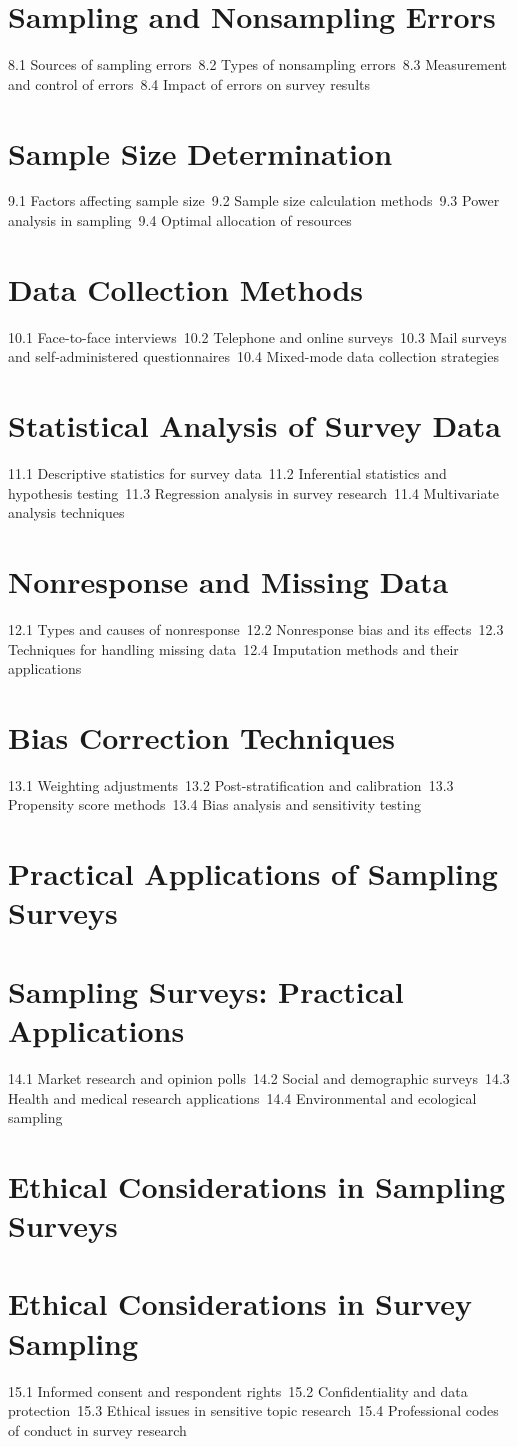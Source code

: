 \section{Sampling and Nonsampling Errors}
8.1 Sources of sampling errors\
8.2 Types of nonsampling errors\
8.3 Measurement and control of errors\
8.4 Impact of errors on survey results\
\section{Sample Size Determination}
9.1 Factors affecting sample size\
9.2 Sample size calculation methods\
9.3 Power analysis in sampling\
9.4 Optimal allocation of resources\
\section{Data Collection Methods}
10.1 Face-to-face interviews\
10.2 Telephone and online surveys\
10.3 Mail surveys and self-administered questionnaires\
10.4 Mixed-mode data collection strategies\
\section{Statistical Analysis of Survey Data}
11.1 Descriptive statistics for survey data\
11.2 Inferential statistics and hypothesis testing\
11.3 Regression analysis in survey research\
11.4 Multivariate analysis techniques\
\section{Nonresponse and Missing Data}
12.1 Types and causes of nonresponse\
12.2 Nonresponse bias and its effects\
12.3 Techniques for handling missing data\
12.4 Imputation methods and their applications\
\section{Bias Correction Techniques}
13.1 Weighting adjustments\
13.2 Post-stratification and calibration\
13.3 Propensity score methods\
13.4 Bias analysis and sensitivity testing\
\section{Practical Applications of Sampling Surveys}
\section{Sampling Surveys: Practical Applications}
14.1 Market research and opinion polls\
14.2 Social and demographic surveys\
14.3 Health and medical research applications\
14.4 Environmental and ecological sampling\
\section{Ethical Considerations in Sampling Surveys}
\section{Ethical Considerations in Survey Sampling}
15.1 Informed consent and respondent rights\
15.2 Confidentiality and data protection\
15.3 Ethical issues in sensitive topic research\
15.4 Professional codes of conduct in survey research\
